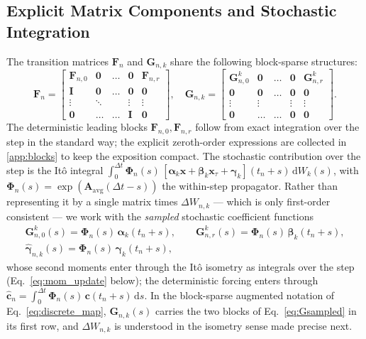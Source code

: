 \documentclass[preprint,12pt]{elsarticle}
\begin{document}
\subsection{Explicit Matrix Components and Stochastic Integration}
The transition matrices $\mathbf{F}_n$ and $\mathbf{G}_{n,k}$ share the following block-sparse structures:
\begin{equation}
\mathbf{F}_n = \begin{bmatrix} \mathbf{F}_{n,0} & \mathbf{0} & \dots & \mathbf{0} & \mathbf{F}_{n,r} \\ \mathbf{I} & \mathbf{0} & \dots & \mathbf{0} & \mathbf{0} \\ \vdots & \ddots & & \vdots & \vdots \\ \mathbf{0} & \dots & \dots & \mathbf{I} & \mathbf{0} \end{bmatrix}, \quad \mathbf{G}_{n,k} = \begin{bmatrix} \mathbf{G}_{n,0}^k & \mathbf{0} & \dots & \mathbf{0} & \mathbf{G}_{n,r}^k \\ \mathbf{0} & \mathbf{0} & \dots & \mathbf{0} & \mathbf{0} \\ \vdots & \vdots & & \vdots & \vdots \\ \mathbf{0} & \dots & \dots & \mathbf{0} & \mathbf{0} \end{bmatrix}.
\end{equation}
The deterministic leading blocks $\mathbf{F}_{n,0}, \mathbf{F}_{n,r}$ follow from exact integration over the step in the standard way; the explicit zeroth-order expressions are collected in \ref{app:blocks} to keep the exposition compact. The stochastic contribution over the step is the It\^o integral $\int_0^{\Delta t}\boldsymbol\Phi_n(s)\,[\boldsymbol\alpha_k \mathbf{x} + \boldsymbol\beta_k \mathbf{x}_\tau + \boldsymbol\gamma_k](t_n{+}s)\,\mathrm{d}W_k(s)$, with $\boldsymbol\Phi_n(s) = \exp(\mathbf{A}_{\mathrm{avg}}(\Delta t - s))$ the within-step propagator. Rather than representing it by a single matrix times $\Delta W_{n,k}$ --- which is only first-order consistent --- we work with the \emph{sampled} stochastic coefficient functions
\begin{equation}
\label{eq:Gsampled}
\begin{gathered}
\mathbf{G}^k_{n,0}(s) = \boldsymbol\Phi_n(s)\, \boldsymbol{\alpha}_k(t_n+s), \qquad
\mathbf{G}^k_{n,r}(s) = \boldsymbol\Phi_n(s)\, \boldsymbol{\beta}_k(t_n+s), \\
\hat{\boldsymbol\gamma}_{n,k}(s) = \boldsymbol\Phi_n(s)\, \boldsymbol{\gamma}_k(t_n+s),
\end{gathered}
\end{equation}
whose second moments enter through the It\^o isometry as integrals over the step (Eq.~\eqref{eq:mom_update} below); the deterministic forcing enters through $\hat{\mathbf{c}}_n = \int_0^{\Delta t} \boldsymbol\Phi_n(s)\, \mathbf{c}(t_n+s)\, \mathrm{d}s$. In the block-sparse augmented notation of Eq.~\eqref{eq:discrete_map}, $\mathbf{G}_{n,k}(s)$ carries the two blocks of Eq.~\eqref{eq:Gsampled} in its first row, and $\Delta W_{n,k}$ is understood in the isometry sense made precise next.
\end{document}

